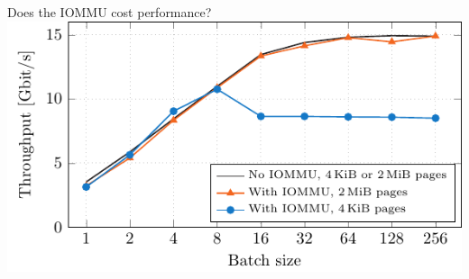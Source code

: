 \documentclass[NET,english,aspectratio=169,notitleframe]{tumbeamer}
\begin{document}
\begin{frame}{Does the IOMMU cost performance?}
\centering\includegraphics[scale=1.1]{figures/batches-iommu.pdf}
\end{frame}

%
%
%
%
\end{document}

